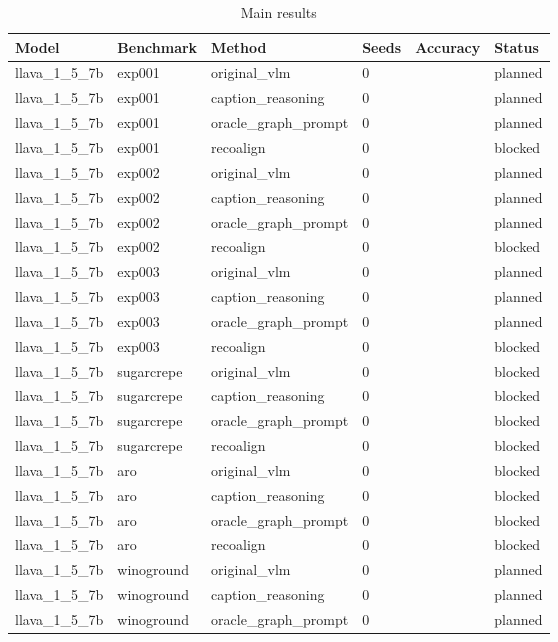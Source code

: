 \begin{table}[t]
\centering
\caption{Main results}
\begin{tabular}{llllll}
\toprule
Model & Benchmark & Method & Seeds & Accuracy & Status \\
\midrule
llava\_1\_5\_7b & exp001 & original\_vlm & 0 &  & planned \\
llava\_1\_5\_7b & exp001 & caption\_reasoning & 0 &  & planned \\
llava\_1\_5\_7b & exp001 & oracle\_graph\_prompt & 0 &  & planned \\
llava\_1\_5\_7b & exp001 & recoalign & 0 &  & blocked \\
llava\_1\_5\_7b & exp002 & original\_vlm & 0 &  & planned \\
llava\_1\_5\_7b & exp002 & caption\_reasoning & 0 &  & planned \\
llava\_1\_5\_7b & exp002 & oracle\_graph\_prompt & 0 &  & planned \\
llava\_1\_5\_7b & exp002 & recoalign & 0 &  & blocked \\
llava\_1\_5\_7b & exp003 & original\_vlm & 0 &  & planned \\
llava\_1\_5\_7b & exp003 & caption\_reasoning & 0 &  & planned \\
llava\_1\_5\_7b & exp003 & oracle\_graph\_prompt & 0 &  & planned \\
llava\_1\_5\_7b & exp003 & recoalign & 0 &  & blocked \\
llava\_1\_5\_7b & sugarcrepe & original\_vlm & 0 &  & blocked \\
llava\_1\_5\_7b & sugarcrepe & caption\_reasoning & 0 &  & blocked \\
llava\_1\_5\_7b & sugarcrepe & oracle\_graph\_prompt & 0 &  & blocked \\
llava\_1\_5\_7b & sugarcrepe & recoalign & 0 &  & blocked \\
llava\_1\_5\_7b & aro & original\_vlm & 0 &  & blocked \\
llava\_1\_5\_7b & aro & caption\_reasoning & 0 &  & blocked \\
llava\_1\_5\_7b & aro & oracle\_graph\_prompt & 0 &  & blocked \\
llava\_1\_5\_7b & aro & recoalign & 0 &  & blocked \\
llava\_1\_5\_7b & winoground & original\_vlm & 0 &  & planned \\
llava\_1\_5\_7b & winoground & caption\_reasoning & 0 &  & planned \\
llava\_1\_5\_7b & winoground & oracle\_graph\_prompt & 0 &  & planned \\

\end{tabular}
\end{table}
